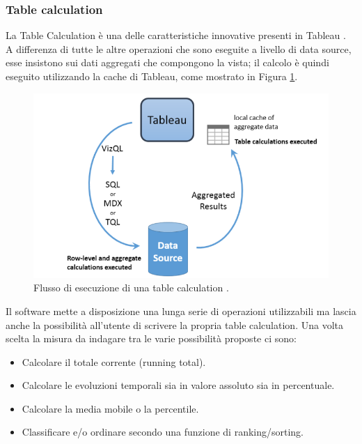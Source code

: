 \subsubsection{Table calculation}

La Table Calculation è una delle caratteristiche innovative presenti in Tableau \cite{tableCalculation_tableau}. A differenza di tutte le altre operazioni che sono eseguite a livello di data source, esse insistono sui dati aggregati che compongono la vista; il calcolo è quindi eseguito utilizzando la cache di Tableau, come mostrato in Figura \ref{fig:TableCalculation}.

\begin{figure}[ht]
    \begin{center}
        \includegraphics[width=0.8\linewidth]{Figures/TableCalculation.png}
    \end{center}
    \caption{Flusso di esecuzione di una table calculation \protect\cite{tableauFlow_image}.}
    \label{fig:TableCalculation}
\end{figure}

Il software mette a disposizione una lunga serie di operazioni utilizzabili ma lascia anche la possibilità all'utente di scrivere la propria table calculation. Una volta scelta la misura da indagare tra le varie possibilità proposte ci sono:

\begin{itemize}
    \item Calcolare il totale corrente (running total).
    \item Calcolare le evoluzioni temporali sia in valore assoluto sia in percentuale.
    \item Calcolare la media mobile o la percentile.
    \item Classificare e/o ordinare secondo una funzione di ranking/sorting.
\end{itemize}

